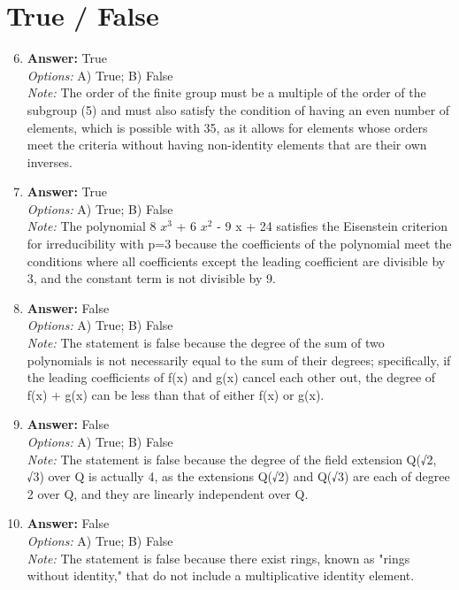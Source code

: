 \documentclass[12pt]{article}
\begin{document}
\section*{True / False}
\begin{enumerate}[label=\arabic*.]
\setcounter{enumi}{5}
\item \textbf{Answer:} True
\\ \textit{Options:} A) True; B) False
\\ \textit{Note:} The order of the finite group must be a multiple of the order of the subgroup (5) and must also satisfy the condition of having an even number of elements, which is possible with 35, as it allows for elements whose orders meet the criteria without having non-identity elements that are their own inverses.
\item \textbf{Answer:} True
\\ \textit{Options:} A) True; B) False
\\ \textit{Note:} The polynomial 8 $x^3$ + 6 $x^2$ - 9 x + 24 satisfies the Eisenstein criterion for irreducibility with p=3 because the coefficients of the polynomial meet the conditions where all coefficients except the leading coefficient are divisible by 3, and the constant term is not divisible by 9.
\item \textbf{Answer:} False
\\ \textit{Options:} A) True; B) False
\\ \textit{Note:} The statement is false because the degree of the sum of two polynomials is not necessarily equal to the sum of their degrees; specifically, if the leading coefficients of f(x) and g(x) cancel each other out, the degree of f(x) + g(x) can be less than that of either f(x) or g(x).
\item \textbf{Answer:} False
\\ \textit{Options:} A) True; B) False
\\ \textit{Note:} The statement is false because the degree of the field extension Q(√2, √3) over Q is actually 4, as the extensions Q(√2) and Q(√3) are each of degree 2 over Q, and they are linearly independent over Q.
\item \textbf{Answer:} False
\\ \textit{Options:} A) True; B) False
\\ \textit{Note:} The statement is false because there exist rings, known as "rings without identity," that do not include a multiplicative identity element.
\end{enumerate}
\end{document}
